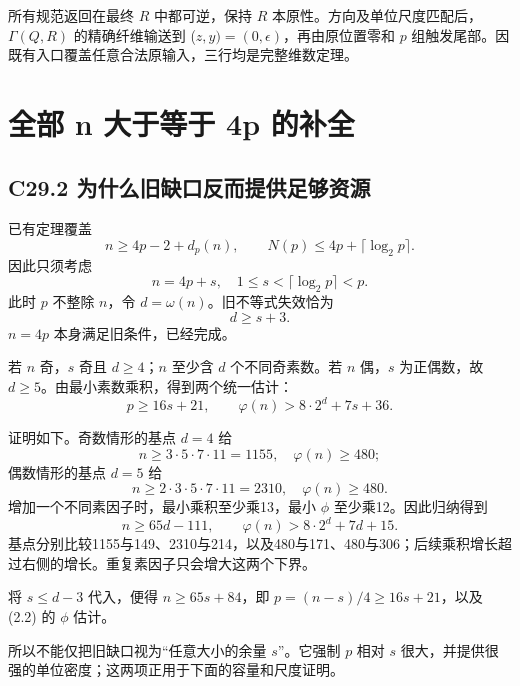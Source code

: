 {所有规范返回在最终} {\ensuremath{R}} {中都可逆，保持} {\ensuremath{R}} {本原性。方向及单位尺度匹配后，\ensuremath{\Gamma (Q,R)}} {的精确纤维输送到} {(\ensuremath{z,y)=(0,\epsilon )}，再由原位置零和} {\ensuremath{p}} {组触发尾部。因既有入口覆盖任意合法原输入，三行均是完整维数定理。}


\section{全部 n 大于等于 4p 的补全}\label{construct:wide-tail}
\subsection*{\texorpdfstring{{C29.2} {为什么旧缺口反而提供足够资源}}{C29.2 为什么旧缺口反而提供足够资源}}\label{C29-h182}

{已有定理覆盖} \[
n\ge4p-2+d_p(n),\qquad N(p)\le4p+\lceil\log_2p\rceil.
\] {因此只须考虑} \[
n=4p+s,\quad1\le s<\lceil\log_2p\rceil<p.
\] {此时} {\ensuremath{p}} {不整除} {\ensuremath{n}，令} {\ensuremath{d=\omega (n)}。旧不等式失效恰为} \[
\boxed{d\ge s+3.}
\tag{C29.2.1}
\] {\ensuremath{n=4p}} {本身满足旧条件，已经完成。}

{若} {\ensuremath{n}} {奇，\ensuremath{s}} {奇且} {\ensuremath{d\ge 4}；\ensuremath{n}} {至少含} {\ensuremath{d}} {个不同奇素数。若} {\ensuremath{n}} {偶，\ensuremath{s}} {为正偶数，故} {\ensuremath{d\ge 5}。由最小素数乘积，得到两个统一估计：} \[
\boxed{p\ge16s+21,\qquad
\varphi(n)>8\cdot2^d+7s+36.}
\tag{C29.2.2}
\]

{证明如下。奇数情形的基点} {\ensuremath{d=4}} {给} \[
n\ge3\cdot5\cdot7\cdot11=1155,\quad\varphi(n)\ge480;
\] {偶数情形的基点} {\ensuremath{d=5}} {给} \[
n\ge2\cdot3\cdot5\cdot7\cdot11=2310,\quad\varphi(n)\ge480.
\] {增加一个不同素因子时，最小乘积至少乘13，最小} {\ensuremath{\phi }} {至少乘12。因此归纳得到} \[
n\ge65d-111,\qquad\varphi(n)>8\cdot2^d+7d+15.
\] {基点分别比较1155与149、2310与214，以及480与171、480与306；后续乘积增长超过右侧的增长。重复素因子只会增大这两个下界。}

{将} {\ensuremath{s\le d-3}} {代入，便得} {\ensuremath{n\ge 65s+84}，即} {\ensuremath{p=(n-s)/4\ge 16s+21}，以及} {(2.2)} {的} {\ensuremath{\phi }} {估计。}

{所以不能仅把旧缺口视为``任意大小的余量} {\ensuremath{s}''。它强制} {\ensuremath{p}} {相对} {\ensuremath{s}} {很大，并提供很强的单位密度；这两项正用于下面的容量和尺度证明。}

